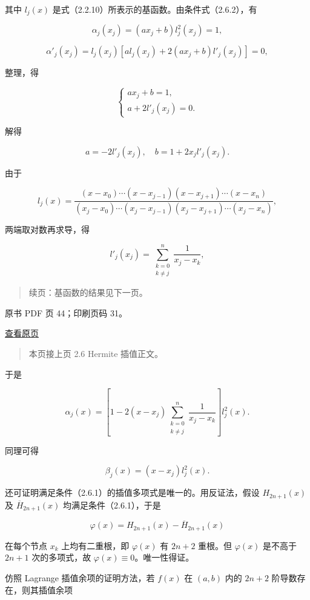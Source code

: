 其中 \(l_j(x)\) 是式（2.2.10）所表示的基函数。由条件式（2.6.2），有

\[\alpha_j(x_j)=(ax_j+b)l_j^2(x_j)=1,\]

\[\alpha'_j(x_j)=l_j(x_j)[al_j(x_j)+2(ax_j+b)l'_j(x_j)]=0,\]

整理，得

\[\begin{cases}ax_j+b=1,\\a+2l'_j(x_j)=0.\end{cases}\]

解得

\[a=-2l'_j(x_j),\quad b=1+2x_jl'_j(x_j).\]

由于

\[l_j(x)=\frac{(x-x_0)\cdots(x-x_{j-1})(x-x_{j+1})\cdots(x-x_n)}{(x_j-x_0)\cdots(x_j-x_{j-1})(x_j-x_{j+1})\cdots(x_j-x_n)},\]

两端取对数再求导，得

\[l'_j(x_j)=\sum_{\substack{k=0\\k\ne j}}^{n}\frac{1}{x_j-x_k},\]

\begin{quote}
续页：基函数的结果见下一页。
\end{quote}

\clearpage

原书 PDF 页 44；印刷页码 31。

\href{source-images/pdf-044.jpeg}{查看原页}

\begin{quote}
本页接上页 2.6 Hermite 插值正文。
\end{quote}

于是

\[\alpha_j(x)=\left[1-2(x-x_j)\sum_{\substack{k=0\\k\ne j}}^n\frac{1}{x_j-x_k}\right]l_j^2(x).\tag{2.6.4}\]

同理可得

\[\beta_j(x)=(x-x_j)l_j^2(x).\tag{2.6.5}\]

还可证明满足条件（2.6.1）的插值多项式是唯一的。用反证法，假设 \(H_{2n+1}(x)\) 及 \(\overline H_{2n+1}(x)\) 均满足条件（2.6.1），于是

\[\varphi(x)=H_{2n+1}(x)-\overline H_{2n+1}(x)\]

在每个节点 \(x_k\) 上均有二重根，即 \(\varphi(x)\) 有 \(2n+2\) 重根。但 \(\varphi(x)\) 是不高于 \(2n+1\) 次的多项式，故 \(\varphi(x)\equiv0\)。唯一性得证。

仿照 Lagrange 插值余项的证明方法，若 \(f(x)\) 在 \((a,b)\) 内的 \(2n+2\) 阶导数存在，则其插值余项

